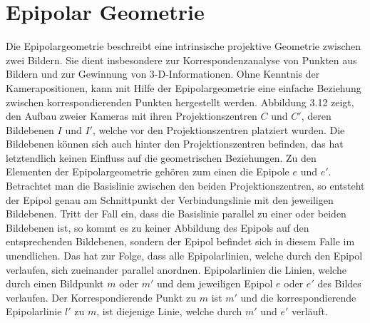 \chapter{Epipolar Geometrie}
\label{sec:epipolar} 


Die Epipolargeometrie beschreibt eine intrinsische projektive Geometrie zwischen zwei Bildern\cite{HZ}. Sie dient insbesondere zur Korrespondenzanalyse von Punkten aus Bildern und zur Gewinnung von 3-D-Informationen. Ohne Kenntnis der Kamerapositionen, kann mit Hilfe der Epipolargeometrie eine einfache Beziehung zwischen korrespondierenden Punkten hergestellt werden. Abbildung 3.12 zeigt, den Aufbau zweier Kameras mit ihren Projektionszentren $C$ und $C'$, deren Bildebenen $I$ und $I'$, welche vor den Projektionszentren platziert wurden. Die Bildebenen können sich auch hinter den Projektionszentren befinden, das hat letztendlich keinen Einfluss auf die geometrischen Beziehungen\cite{HZ}. Zu den Elementen der Epipolargeometrie gehören zum einen die Epipole $e$ und $e'$. Betrachtet man die Basislinie zwischen den beiden Projektionszentren, so entsteht der Epipol genau am Schnittpunkt der Verbindungslinie mit den jeweiligen Bildebenen. Tritt der Fall ein, dass die Basislinie parallel zu einer oder beiden Bildebenen ist, so kommt es zu keiner Abbildung des Epipols auf den entsprechenden Bildebenen, sondern der Epipol befindet sich in diesem Falle im unendlichen\cite{ZZGXr}. Das hat zur Folge, dass alle Epipolarlinien, welche durch den Epipol verlaufen, sich zueinander parallel anordnen. Epipolarlinien die Linien, welche durch einen Bildpunkt $m$ oder $m'$ und dem jeweiligen Epipol $e$ oder $e'$ des Bildes verlaufen. Der Korrespondierende Punkt zu $m$ ist $m'$ und die korrespondierende Epipolarlinie $l'$ zu $m$, ist diejenige Linie, welche durch $m'$ und $e'$ verläuft. 


